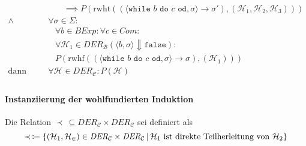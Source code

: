 \begin{align*}
						                  & \quad\quad \implies P(\text{rwht}((\langle \texttt{while } b \texttt{ do } c \texttt{ od}, \sigma \rangle \rightarrow \sigma'), (\mathcal{H} _ 1, \mathcal{H} _ 2, \mathcal{H} _ 3)))                                      \\
						\land             & \,\forall \sigma \in \Sigma :                                                                                                                                                                                              \\
						                  & \quad \forall b \in \textit{BExp} : \forall c \in \textit{Com} :                                                                                                                                                           \\
						                  & \quad \forall \mathcal{H} _ 1 \in \textit{DER} _ \mathcal{B} (\langle b, \sigma \rangle \Downarrow \texttt{false}) :                                                                                                       \\
						                  & \quad P(\text{rwhf}((\langle \texttt{while } b \texttt{ do } c \texttt{ od}, \sigma \rangle \rightarrow \sigma), (\mathcal{H} _ 1)))                                                                                       \\
						\text{dann gilt:} & \,\forall \mathcal{H} \in \textit{DER} _ \mathcal{C} : P(\mathcal{H})                                                                                                                                                      \\
					\end{align*}

				\paragraph{Instanziierung der wohlfundierten Induktion}
					Die Relation $ \prec \,\subseteq \textit{DER} _ \mathcal{C} \times \textit{DER} _ \mathcal{C} $ sei definiert als \[ \prec \,\coloneqq \{ (\mathcal{H} _ 1, \mathcal{H _ 2}) \in \textit{DER} _ \mathcal{C} \times \textit{DER} _ \mathcal{C} \,\vert\, \mathcal{H} _ 1 \text{ ist direkte Teilherleitung von } \mathcal{H} _ 2 \} \]

